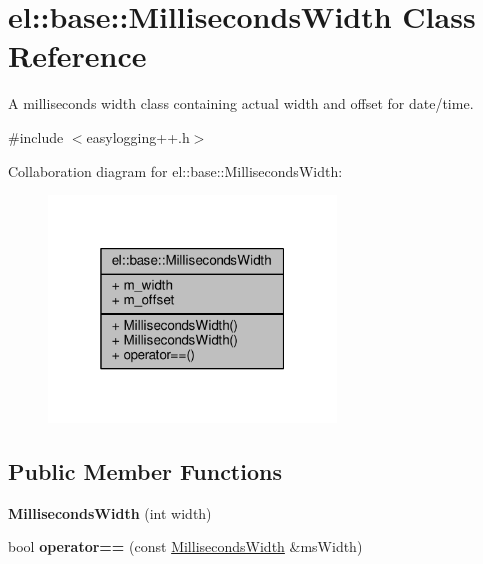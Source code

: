 \hypertarget{classel_1_1base_1_1MillisecondsWidth}{}\section{el\+:\+:base\+:\+:Milliseconds\+Width Class Reference}
\label{classel_1_1base_1_1MillisecondsWidth}


A milliseconds width class containing actual width and offset for date/time.  




{\ttfamily \#include $<$easylogging++.\+h$>$}



Collaboration diagram for el\+:\+:base\+:\+:Milliseconds\+Width\+:
\nopagebreak
\begin{figure}[H]
\begin{center}
\leavevmode
\includegraphics[width=217pt]{dc/dc9/classel_1_1base_1_1MillisecondsWidth__coll__graph}
\end{center}
\end{figure}
\subsection*{Public Member Functions}
\begin{DoxyCompactItemize}
\item 
{\bfseries Milliseconds\+Width} (int width)\hypertarget{classel_1_1base_1_1MillisecondsWidth_a358fa0fcdd4076c4038ecdfc206de38a}{}\label{classel_1_1base_1_1MillisecondsWidth_a358fa0fcdd4076c4038ecdfc206de38a}

\item 
bool {\bfseries operator==} (const \hyperlink{classel_1_1base_1_1MillisecondsWidth}{Milliseconds\+Width} \&ms\+Width)\hypertarget{classel_1_1base_1_1MillisecondsWidth_a60f5fb6e31216d1268585b98d20517ff}{}\label{classel_1_1base_1_1MillisecondsWidth_a60f5fb6e31216d1268585b98d20517ff}

\end{DoxyCompactItemize}
